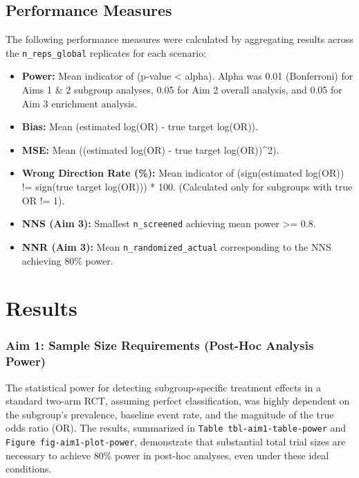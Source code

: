 \documentclass[
  letterpaper,
  DIV=11,
  numbers=noendperiod]{scrartcl}
\providecommand{\tightlist}{%
  \setlength{\itemsep}{0pt}\setlength{\parskip}{0pt}}
\begin{document}
\subsection{Performance Measures}\label{performance-measures}

The following performance measures were calculated by aggregating
results across the \texttt{n\_reps\_global} replicates for each
scenario:

\begin{itemize}
\tightlist
\item
  \textbf{Power:} Mean indicator of (p-value \textless{} alpha). Alpha
  was 0.01 (Bonferroni) for Aims 1 \& 2 subgroup analyses, 0.05 for Aim
  2 overall analysis, and 0.05 for Aim 3 enrichment analysis.
\item
  \textbf{Bias:} Mean (estimated log(OR) - true target log(OR)).
\item
  \textbf{MSE:} Mean ((estimated log(OR) - true target log(OR))\^{}2).
\item
  \textbf{Wrong Direction Rate (\%):} Mean indicator of (sign(estimated
  log(OR)) != sign(true target log(OR))) * 100. (Calculated only for
  subgroups with true OR != 1).
\item
  \textbf{NNS (Aim 3):} Smallest \texttt{n\_screened} achieving mean
  power \textgreater= 0.8.
\item
  \textbf{NNR (Aim 3):} Mean \texttt{n\_randomized\_actual}
  corresponding to the NNS achieving 80\% power.
\end{itemize}

\section{Results}\label{results}

\subsubsection{Aim 1: Sample Size Requirements (Post-Hoc Analysis
Power)}\label{aim-1-sample-size-requirements-post-hoc-analysis-power}

The statistical power for detecting subgroup-specific treatment effects
in a standard two-arm RCT, assuming perfect classification, was highly
dependent on the subgroup's prevalence, baseline event rate, and the
magnitude of the true odds ratio (OR). The results, summarized in
\texttt{Table\ tbl-aim1-table-power} and
\texttt{Figure\ fig-aim1-plot-power}, demonstrate that substantial total
trial sizes are necessary to achieve 80\% power in post-hoc analyses,
even under these ideal conditions.
\end{document}
